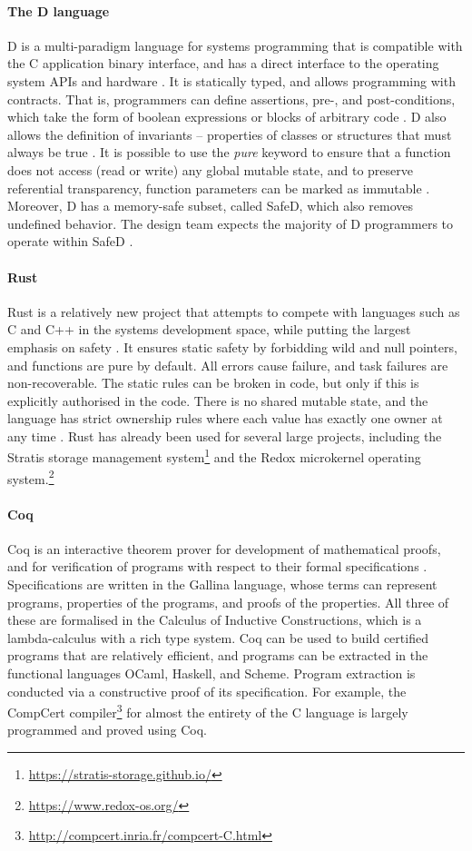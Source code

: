 \paragraph{The D language}
D is a multi-paradigm language for systems programming that is compatible with the C application binary interface, and has a direct interface to the operating system APIs and hardware \cite{dlangTour}.
It is statically typed, and allows programming with contracts.
That is, programmers can define assertions, pre-, and post-conditions, which take the form of boolean expressions or blocks of arbitrary code \cite{dlangContracts}.
D also allows the definition of invariants -- properties of classes or structures that must always be true \cite{dlangContracts}.
It is possible to use the \textit{pure} keyword to ensure that a function does not access (read or write) any global mutable state, and to preserve referential transparency, function parameters can be marked as immutable \cite{nadlinger2012}.
Moreover, D has a memory-safe subset, called SafeD, which also removes undefined behavior.
The design team expects the majority of D programmers to operate within SafeD \cite{milewski}.

\paragraph{Rust}
Rust is a relatively new project that attempts to compete with languages such as C and C++ in the systems development space, while putting the largest emphasis on safety \cite{hoare2010}.
It ensures static safety by forbidding wild and null pointers, and functions are pure by default.
All errors cause failure, and task failures are non-recoverable.
The static rules can be broken in code, but only if this is explicitly authorised in the code.
There is no shared mutable state, and the language has strict ownership rules where each value has exactly one owner at any time \cite{klabnik2019}.
Rust has already been used for several large projects, including the Stratis storage management system\footnote{\url{https://stratis-storage.github.io/}} and the Redox microkernel operating system.\footnote{\url{https://www.redox-os.org/}}

\paragraph{Coq}
Coq is an interactive theorem prover for development of mathematical proofs, and for verification of programs with respect to their formal specifications \cite{coqRM}.
Specifications are written in the Gallina language, whose terms can represent programs, properties of the programs, and proofs of the properties.
All three of these are formalised in the Calculus of Inductive Constructions, which is a lambda-calculus with a rich type system.
Coq can be used to build certified programs that are relatively efficient, and programs can be extracted in the functional languages OCaml, Haskell, and Scheme.
Program extraction is conducted via a constructive proof of its specification.
For example, the CompCert compiler\footnote{\url{http://compcert.inria.fr/compcert-C.html}} for almost the entirety of the C language is largely programmed and proved using Coq.

